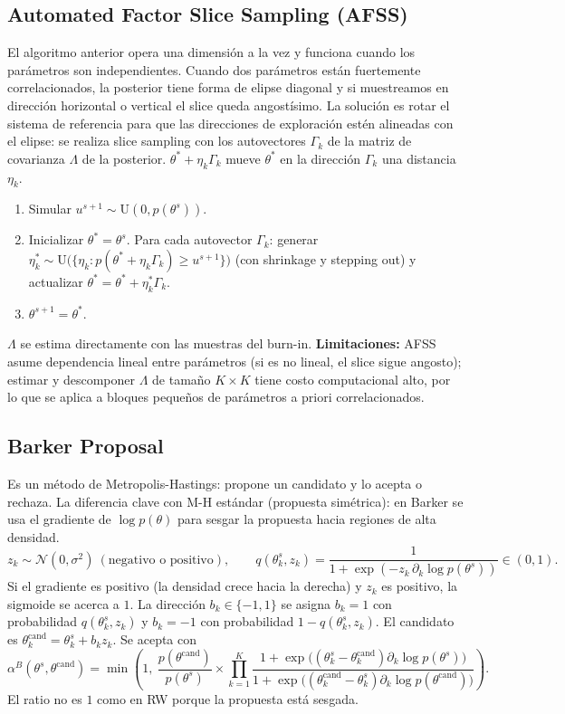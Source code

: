 \documentclass[11pt]{article}
\newcommand{\N}{\mathcal{N}}
\theoremstyle{definition}
\begin{document}
\subsection{Automated Factor Slice Sampling (AFSS)}
El algoritmo anterior opera una dimensión a la vez y funciona cuando los parámetros son independientes. Cuando dos parámetros están fuertemente correlacionados, la posterior tiene forma de elipse diagonal y si muestreamos en dirección horizontal o vertical el slice queda angostísimo. La solución es rotar el sistema de referencia para que las direcciones de exploración estén alineadas con el elipse: se realiza slice sampling con los autovectores $\Gamma_k$ de la matriz de covarianza $\Lambda$ de la posterior. $\theta^*+\eta_k\Gamma_k$ mueve $\theta^*$ en la dirección $\Gamma_k$ una distancia $\eta_k$.
\begin{enumerate}[leftmargin=2em]
  \item Simular $u^{s+1}\sim\text{U}(0,p(\theta^s))$.
  \item Inicializar $\theta^*=\theta^s$. Para cada autovector $\Gamma_k$: generar $\eta_k^*\sim\text{U}\big(\{\eta_k:p(\theta^*+\eta_k\Gamma_k)\ge u^{s+1}\}\big)$ (con shrinkage y stepping out) y actualizar $\theta^*=\theta^*+\eta_k^*\Gamma_k$.
  \item $\theta^{s+1}=\theta^*$.
\end{enumerate}
$\Lambda$ se estima directamente con las muestras del burn-in. \textbf{Limitaciones:} AFSS asume dependencia lineal entre parámetros (si es no lineal, el slice sigue angosto); estimar y descomponer $\Lambda$ de tamaño $K\times K$ tiene costo computacional alto, por lo que se aplica a bloques pequeños de parámetros a priori correlacionados.

\subsection{Barker Proposal}
Es un método de Metropolis-Hastings: propone un candidato y lo acepta o rechaza. La diferencia clave con M-H estándar (propuesta simétrica): en Barker se usa el gradiente de $\log p(\theta)$ para sesgar la propuesta hacia regiones de alta densidad.
\[
z_k\sim\N(0,\sigma^2)\ (\text{negativo o positivo}),\qquad
q(\theta_k^s,z_k)=\frac{1}{1+\exp(-z_k\,\partial_k\log p(\theta^s))}\in(0,1).
\]
Si el gradiente es positivo (la densidad crece hacia la derecha) y $z_k$ es positivo, la sigmoide se acerca a $1$. La dirección $b_k\in\{-1,1\}$ se asigna $b_k=1$ con probabilidad $q(\theta_k^s,z_k)$ y $b_k=-1$ con probabilidad $1-q(\theta_k^s,z_k)$. El candidato es $\theta_k^{\text{cand}}=\theta_k^s+b_k z_k$. Se acepta con
\[
\alpha^B(\theta^s,\theta^{\text{cand}})=\min\!\left(1,\ \frac{p(\theta^{\text{cand}})}{p(\theta^s)}\times\prod_{k=1}^K\frac{1+\exp\big((\theta_k^s-\theta_k^{\text{cand}})\partial_k\log p(\theta^s)\big)}{1+\exp\big((\theta_k^{\text{cand}}-\theta_k^s)\partial_k\log p(\theta^{\text{cand}})\big)}\right).
\]
El ratio no es $1$ como en RW porque la propuesta está sesgada.
\end{document}
